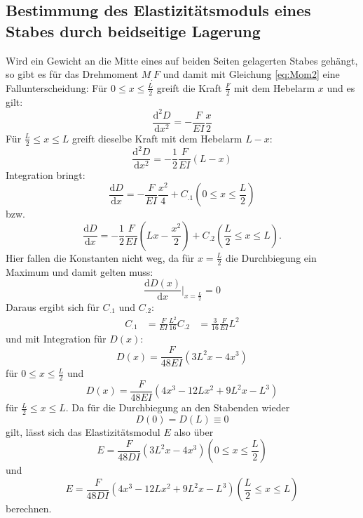 \subsection{Bestimmung des Elastizitätsmoduls eines Stabes durch beidseitige Lagerung}

Wird ein Gewicht an die Mitte eines auf beiden Seiten gelagerten Stabes gehängt, so gibt es für das Drehmoment $M_.F$ und damit mit Gleichung \eqref{eq:Mom2} eine Fallunterscheidung:
Für $0 \leq x \leq \frac{L}{2}$ greift die Kraft $\frac{F}{2}$ mit dem Hebelarm $x$ und es gilt:
\[
\frac{\mathrm{d}^2D}{\mathrm{d}x^2} = -\frac{F}{E I}\frac{x}{2}
\]
Für $\frac{L}{2} \leq x \leq L$ greift dieselbe Kraft mit dem Hebelarm $L-x$:
\[
\frac{\mathrm{d}^2D}{\mathrm{d}x^2} = -\frac{1}{2}\frac{F}{E I} (L-x)
\]
Integration bringt:
\[
\frac{\mathrm{d}D}{\mathrm{d}x} = -\frac{F}{E I}\frac{x^2}{4} + C_.1  \left(0 \leq x \leq \frac{L}{2}\right)
\]
bzw.
\[
\frac{\mathrm{d}D}{\mathrm{d}x} = -\frac{1}{2}\frac{F}{E I}\left(L x - \frac{x^2}{2}\right) + C_.2  \left(\frac{L}{2} \leq x \leq L\right) \text{.}
\]
Hier fallen die Konstanten nicht weg, da für $x = \frac{L}{2}$ die Durchbiegung ein Maximum und damit gelten muss:
\[
\frac{\mathrm{d}D(x)}{\mathrm{d}x}|_{x = \frac{L}{2}} = 0
\]
Daraus ergibt sich für $C_.1$ und $C_.2$:
\begin{align*}
C_.1 &= \frac{F}{E I}\frac{L^2}{16}
C_.2 &= \frac{3}{16}\frac{F}{E I} L^2
\end{align*}
und mit Integration für $D(x)$:
\begin{equation*}
D(x) = \frac{F}{48 E I}\left(3 L^2 x - 4 x^3\right)
\end{equation*}
für $0 \leq x \leq \frac{L}{2}$ und
\begin{equation*}
D(x) = \frac{F}{48 E I}\left(4 x^3 - 12 L x^2 + 9 L^2 x - L^3\right)
\end{equation*}
für $\frac{L}{2} \leq x \leq L$.
Da für die Durchbiegung an den Stabenden wieder \[D(0)=D(L)\equiv 0 \] gilt, lässt sich das Elastizitätsmodul $E$ also über
\begin{equation}
E = \frac{F}{48 D I}\left(3 L^2 x - 4 x^3\right)   \left(0 \leq x \leq \frac{L}{2}\right) \label{eq:E2}
\end{equation}
und
\begin{equation}
E = \frac{F}{48 D I}\left(4 x^3 - 12 L x^2 + 9 L^2 x - L^3\right)  \left(\frac{L}{2} \leq x \leq L\right) \label{eq:E3}
\end{equation}
berechnen.